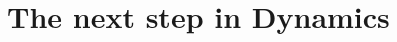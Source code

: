\documentclass[a4paper,12pt,twoside]{report}
\newtheorem{Theorem}{Theorem}[]
\begin{document}




\section{The next step in Dynamics}




\end{document}
